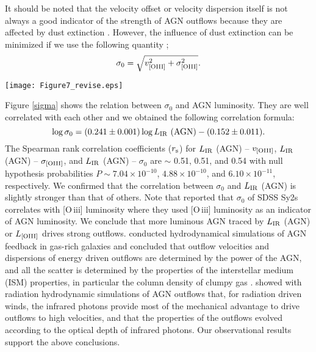 \documentclass[twocolumn]{aastex6}
\newcommand{\oiii}{[O{\,\sc iii}]\,\,}
\begin{document}
It should be noted that the velocity offset or velocity dispersion itself is not always a good indicator of the strength of AGN outflows because they are affected by dust extinction \citep{Bae_16}.
However, the influence of dust extinction can be minimized if we use the following quantity \citep{Bae_16,Bae_17}; 
\begin{equation}
\sigma_0 = \sqrt{v_{\rm [OIII]}^2 + \sigma_{\rm [OIII]}^2}.
\end{equation}

   \begin{figure*}
   \centering
   \texttt{[image: Figure7\_revise.eps]}
   \caption{$\sigma_0$ as a function of IR luminosity contributed from AGN for IR-bright DOG sample (red) and SDSS Sy2 sample (blue). The yellow lines represent the best-fit linear function for both data.}
   \label{sigma}
   \end{figure*}

Figure \ref{sigma} shows the relation between $\sigma_0$ and AGN luminosity.
They are well correlated with each other and we obtained the following correlation formula:
\begin{equation}
\log \sigma_0 =  (0.241 \pm 0.001) \log L_{\rm IR} \,\, {\rm (AGN)} 
			        -  (0.152 \pm 0.011).     
\end{equation}
The Spearman rank correlation coefficients ($r_{\rm s}$) for $L_{\rm IR}$ (AGN) -- $v_{\rm [OIII]}$, $L_{\rm IR}$ (AGN) -- $\sigma_{\rm [OIII]}$, and $L_{\rm IR}$ (AGN) -- $\sigma_0$ are $\sim$ 0.51, 0.51, and 0.54 with null hypothesis probabilities $P \sim 7.04 \times 10^{-10}$, $4.88 \times 10^{-10}$, and $6.10 \times 10^{-11}$, respectively. 
We confirmed that the correlation between $\sigma_0$ and $L_{\rm IR}$ (AGN) is slightly stronger than that of others.
Note that \cite{Woo} reported that $\sigma_0$ of SDSS Sy2s correlates with \oiii luminosity where they used \oiii luminosity as an indicator of AGN luminosity.
We conclude that more luminous AGN traced by $L_{\rm IR}$ (AGN) or $L_{\rm [OIII]}$ drives strong outflows. 
\cite{Wagner_11} conducted hydrodynamical simulations of AGN feedback in gas-rich galaxies and concluded that outflow velocities and dispersions of energy driven outflows are determined by the power of the AGN, and all the scatter is determined by the properties of the interstellar medium (ISM) properties, in particular the column density of clumpy gas \citep[see also][]{Wagner_13}.
\cite{Bieri} showed with radiation hydrodynamic simulations of AGN outflows that, for radiation driven winds, the infrared photons provide most of the mechanical advantage to drive outflows to high velocities, and that the properties of the outflows evolved according to the optical depth of infrared photons.
Our observational results support the above conclusions. 
\end{document}
